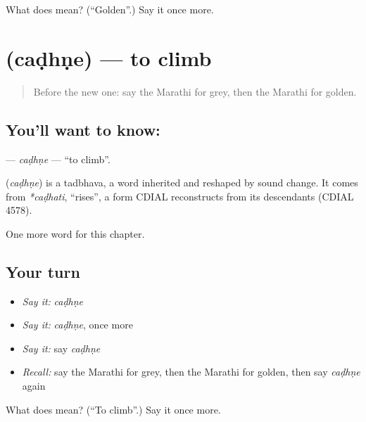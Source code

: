 \begin{tcolorbox}[breakable,colback=teal!4,colframe=teal!35!black,title={Before you move on}]
What does  mean? (\textquotedblleft{}Golden\textquotedblright{}.) Say it once more.
\end{tcolorbox}
\section[\texorpdfstring{\mr{चढणे} (caḍhṇe)}{चढणे (caḍhṇe)}]{ (caḍhṇe) — to climb}

\label{lesson:MR-C153-cadhne}



\begin{quote}
Before the new one: say the Marathi for grey, then the Marathi for golden.
\end{quote}

\subsection*{You'll want to know: }
\textbf{} — \emph{caḍhṇe} — \textquotedblleft{}to climb\textquotedblright{}.

\begin{cousinweb}
\textbf{} (\emph{caḍhṇe}) is a tadbhava, a word inherited and reshaped by sound change. It comes from \emph{*caḍhati}, \textquotedblleft{}rises\textquotedblright{}, a form CDIAL reconstructs from its descendants (CDIAL 4578).
\end{cousinweb}

\begin{grammarlens}[title={What you've built}]
One more word for this chapter.
\end{grammarlens}

\subsection*{Your turn}
\begin{itemize}
\raggedright
  \item \emph{Say it:} \emph{caḍhṇe}
  \item \emph{Say it:} \emph{caḍhṇe}, once more
  \item \emph{Say it:} say \emph{caḍhṇe}
  \item \emph{Recall:} say the Marathi for grey, then the Marathi for golden, then say \emph{caḍhṇe} again
\end{itemize}

\begin{tcolorbox}[breakable,colback=teal!4,colframe=teal!35!black,title={Before you move on}]
What does  mean? (\textquotedblleft{}To climb\textquotedblright{}.) Say it once more.
\end{tcolorbox}
